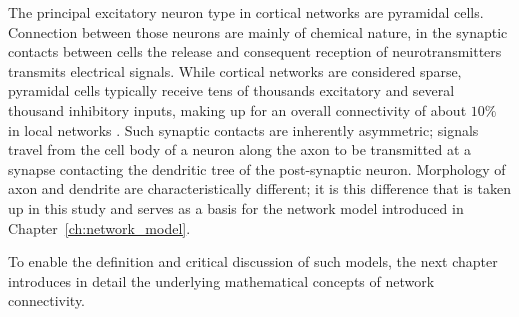 The principal excitatory neuron type in cortical
networks are pyramidal cells. Connection between those neurons are mainly of chemical
nature, in the synaptic contacts between cells the release and
consequent reception of neurotransmitters transmits electrical
signals. While cortical networks are considered sparse, pyramidal
cells typically receive tens of thousands excitatory and several
thousand inhibitory inputs, making up for an overall connectivity of
about $10\%$ in local networks \parencite{Spruston2009}. Such synaptic
contacts are inherently asymmetric; signals travel from the cell body
of a neuron along the axon to be transmitted at a synapse contacting
the dendritic tree of the post-synaptic neuron. Morphology of axon and
dendrite are characteristically different; it is this difference that
is taken up in this study and serves as a basis for the network model
introduced in Chapter~\ref{ch:network_model}. 

To enable the definition and critical discussion of such models, the
next chapter introduces in detail the underlying mathematical concepts
of network connectivity. 









